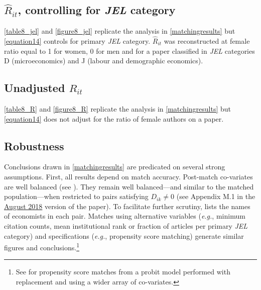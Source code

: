 \begin{appendices}
\begin{refsection}
\subsection{$\widehat R_{it}$, controlling for \emph{JEL} category}
\label{appendixseujel}

\autoref{table8_jel} and \autoref{figure8_jel} replicate the analysis in \autoref{matchingresults} but \autoref{equation14} controls for primary \emph{JEL} category. $\widehat R_{it}$ was reconstructed at female ratio equal to 1 for women, 0 for men and for a paper classified in \emph{JEL} categories D (microeconomics) and J (labour and demographic economics).


\vfill

\vfill

\vfill
\clearpage


\subsection{Unadjusted $R_{it}$}
\label{appendixseur}

\autoref{table8_R} and \autoref{figure8_R} replicate the analysis in \autoref{matchingresults} but \autoref{equation14} does not adjust for the ratio of female authors on a paper.


\vfill

\vfill

\vfill
\clearpage


\subsection{Robustness}
\label{appendixmatchinglimitations}

Conclusions drawn in \autoref{matchingresults} are predicated on several strong assumptions. First, all results depend on match accuracy. Post-match co-variates are well balanced (see ). They remain well balanced---and similar to the matched population---when restricted to pairs satisfying $D_{ik}\ne0$ (see Appendix M.1 in the \href{http://www.erinhengel.com/research/publishing_female20180828.pdf}{August 2018} version of the paper). To facilitate further scrutiny,  lists the names of economists in each pair. Matches using alternative variables (\emph{e.g.}, minimum citation counts, mean institutional rank or fraction of articles per primary \emph{JEL} category) and specifications (\emph{e.g.}, propensity score matching) generate similar figures and conclusions.\footnote{See  \citet[][pp. 30--33]{Hengel2017} for propensity score matches from a probit model performed with replacement and using a wider array of co-variates.}


\end{refsection}
\end{appendices}
